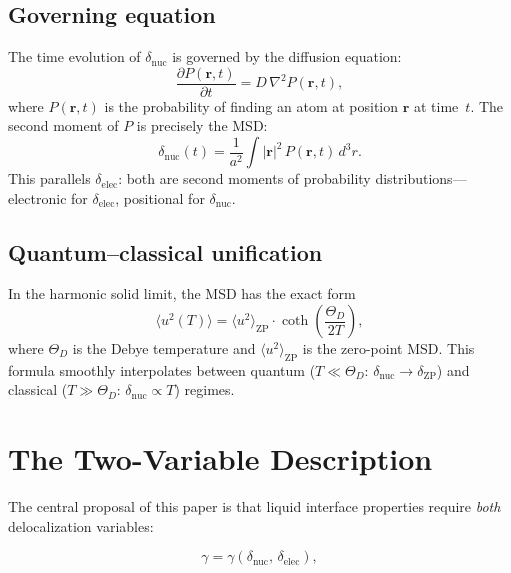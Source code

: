 \documentclass[twocolumn,showpacs,preprintnumbers,amsmath,amssymb,prb]{revtex4-2}
\begin{document}
\subsection{Governing equation}

The time evolution of $\delta_\mathrm{nuc}$ is governed
by the diffusion equation:
\begin{equation}
  \frac{\partial P(\mathbf{r}, t)}{\partial t}
  = D\,\nabla^2 P(\mathbf{r}, t),
  \label{eq:diffusion}
\end{equation}
where $P(\mathbf{r}, t)$ is the probability of finding
an atom at position $\mathbf{r}$ at time~$t$.
The second moment of $P$ is precisely the MSD:
\begin{equation}
  \delta_\mathrm{nuc}(t) = \frac{1}{a^2}
  \int |\mathbf{r}|^2\,P(\mathbf{r},t)\,d^3r.
\end{equation}
This parallels $\delta_\mathrm{elec}$:
both are second moments of probability distributions---electronic
for $\delta_\mathrm{elec}$, positional for $\delta_\mathrm{nuc}$.

\subsection{Quantum--classical unification}

In the harmonic solid limit, the MSD has the exact form
\begin{equation}
  \langle u^2(T) \rangle = \langle u^2 \rangle_\mathrm{ZP}
  \cdot \coth\!\left(\frac{\Theta_D}{2T}\right),
  \label{eq:coth}
\end{equation}
where $\Theta_D$ is the Debye temperature and
$\langle u^2 \rangle_\mathrm{ZP}$ is the zero-point MSD.
This formula smoothly interpolates between quantum
($T \ll \Theta_D$: $\delta_\mathrm{nuc} \to \delta_\mathrm{ZP}$)
and classical ($T \gg \Theta_D$:
$\delta_\mathrm{nuc} \propto T$) regimes.


\section{The Two-Variable Description}
\label{sec:two_var}

The central proposal of this paper is that liquid interface
properties require \emph{both} delocalization variables:

\begin{equation}
  \gamma = \gamma(\delta_\mathrm{nuc},\,\delta_\mathrm{elec}),
  \label{eq:two_var}
\end{equation}
\end{document}
